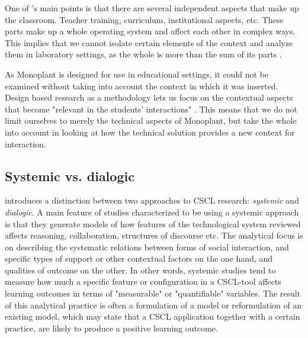 One of \citeauthor{brown1992design}'s main points is that there are several independent aspects that make up the classroom. Teacher training, curriculum, institutional aspects, etc. These parts make up a whole operating system and affect each other in complex ways. This implies that we cannot isolate certain elements of the context and analyze them in laboratory settings, as the whole is more than the sum of its parts \citep{brown1992design}.


As Monoplant is designed for use in educational settings, it could not be examined without taking into account the context in which it was inserted. Design based research as a methodology lets us focus on the contextual aspects that become "relevant in the students' interactions" \citep{krange2009historical}. This means that we do not limit ourselves to merely the technical aspects of Monoplant, but take the whole into account in looking at how the technical solution provides a new context for interaction. 

\subsection{Systemic vs. dialogic}
\citet{arnseth2006approaching} introduces a distinction between two approaches to CSCL research: \emph{systemic} and \emph{dialogic}. A main feature of studies characterized to be using a systemic approach is that they generate models of how features of the technological system reviewed affects reasoning, collaboration, structures of discourse etc. The analytical focus is on describing the systematic relations between forms of social interaction, and specific types of support or other contextual factors on the one hand, and qualities of outcome on the other. \citep{arnseth2006approaching} In other words, systemic studies tend to measure how much a specific feature or configuration in a CSCL-tool affects learning outcomes in terms of "measurable" or "quantifiable" variables. The result of this analytical practice is often a formulation of a model or reformulation of an existing model, which may state that a CSCL application together with a certain practice, are likely to produce a positive learning outcome.

